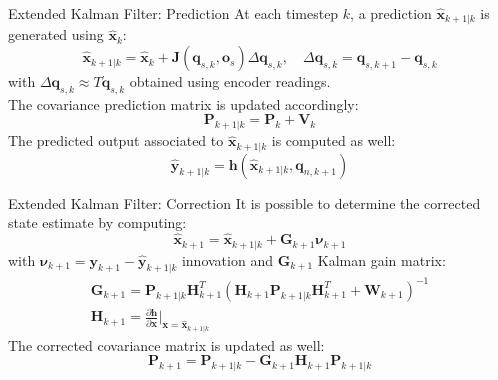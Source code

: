 \documentclass[10pt]{beamer}
\newcommand{\at}[2][]{#1|_{#2}}
\begin{document}
    \begin{frame}{Extended Kalman Filter: Prediction}
        \justifying
        At each timestep $k$, a prediction $\bm{\hat{x}}_{k+1|k}$ is
        generated using %
        $\bm{\hat{x}}_{k}$:
        \begin{equation*}
            \bm{\hat{x}}_{k+1|k} = \bm{\hat{x}}_k + \bm{J}(\bm{q}_{s,k}, \bm{o}_s) \Delta \bm{q}_{s,k},
            \quad \Delta \bm{q}_{s,k} = \bm{q}_{s,k+1} - \bm{q}_{s,k}
        \end{equation*}
        with $\Delta \bm{q}_{s,k} \approx T \bm{\dot{q}}_{s,k}$
        obtained using encoder readings. \\The covariance prediction
        matrix is updated accordingly:
        \begin{equation*}
            \bm{P}_{k+1|k} = \bm{P}_{k} + \bm{V}_{k}
        \end{equation*}
        The predicted output
        associated to $\bm{\hat{x}}_{k+1|k}$ is computed as well:
        \begin{equation*}
            \bm{\hat{y}}_{k+1|k} = \bm{h}(\bm{\hat{x}}_{k+1|k}, \bm{q}_{n, k+1})
        \end{equation*}
    \end{frame}

    \begin{frame}{Extended Kalman Filter: Correction}
        \justifying
        It is possible to determine the corrected state estimate by computing:
        \begin{equation*}
            \bm{\hat{x}}_{k+1} = \bm{\hat{x}}_{k+1|k} + \bm{G}_{k+1} \bm{\nu}_{k+1}
        \end{equation*}
        with $\bm{\nu}_{k+1} = \bm{y}_{k+1} - \bm{\hat{y}}_{k+1|k}$ innovation
        and $\bm{G}_{k+1}$ Kalman gain matrix:
        \begin{gather*}
            \bm{G}_{k+1} = \bm{P}_{k+1|k} \bm{H}_{k+1}^T \left( \bm{H}_{k+1} \bm{P}_{k+1|k} \bm{H}_{k+1}^T + \bm{W}_{k+1} \right)^{-1} \\
            \bm{H}_{k+1} = \frac{\partial \bm{h}}{\partial \bm{x}} \at[\bigg]{\bm{x}=\bm{\hat{x}}_{k+1|k}}
        \end{gather*}
        The corrected covariance matrix is updated as well:
        \begin{equation*}
            \bm{P}_{k+1} = \bm{P}_{k+1|k} - \bm{G}_{k+1} \bm{H}_{k+1} \bm{P}_{k+1|k}
        \end{equation*}
    \end{frame}
\end{document}
